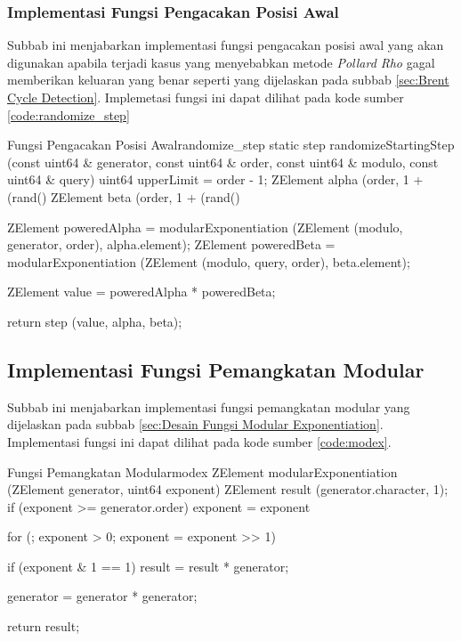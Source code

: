 \subsubsection{Implementasi Fungsi Pengacakan Posisi Awal}

Subbab ini menjabarkan implementasi fungsi pengacakan posisi awal yang akan digunakan apabila terjadi kasus yang menyebabkan metode \textit{Pollard Rho} gagal memberikan keluaran yang benar seperti yang dijelaskan pada subbab \ref{sec:Brent Cycle Detection}. Implemetasi fungsi ini dapat dilihat pada kode sumber \ref{code:randomize_step}
\begin{code}[firstnumber=0]{Fungsi Pengacakan Posisi Awal}{randomize_step}
static step randomizeStartingStep (const uint64 & generator, const uint64 & order, const uint64 & modulo, const uint64 & query)
uint64 upperLimit = order - 1;
ZElement alpha (order, 1 + (rand() %
ZElement beta (order, 1 + (rand() %

ZElement poweredAlpha = modularExponentiation (ZElement (modulo, generator, order), alpha.element);
ZElement poweredBeta = modularExponentiation (ZElement (modulo, query, order), beta.element);

ZElement value = poweredAlpha * poweredBeta;

return step (value, alpha, beta);
\end{code}

\subsection{Implementasi Fungsi Pemangkatan Modular}

Subbab ini menjabarkan implementasi fungsi pemangkatan modular yang dijelaskan pada subbab \ref{sec:Desain Fungsi Modular Exponentiation}. Implementasi fungsi ini dapat dilihat pada kode sumber \ref{code:modex}.
\begin{code}[firstnumber=0, float=h!]{Fungsi Pemangkatan Modular}{modex}
ZElement modularExponentiation (ZElement generator, uint64 exponent)
ZElement result (generator.character, 1);
if (exponent >= generator.order)
exponent = exponent %

for (; exponent > 0; exponent = exponent >> 1)
{
	if (exponent & 1 == 1)
	{
		result = result * generator;
	}
	
	generator = generator * generator;
}

return result;
\end{code}

